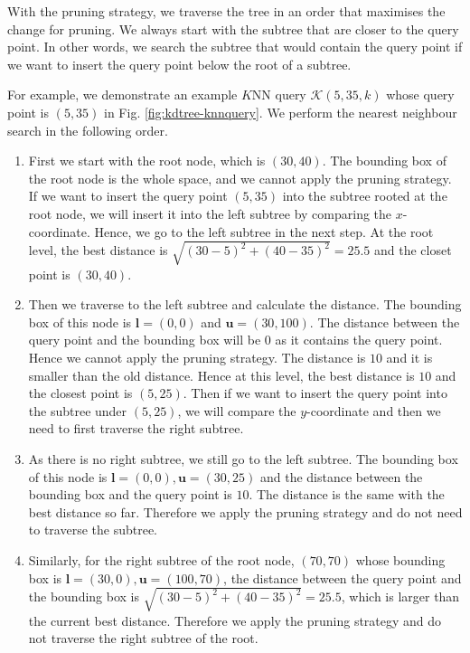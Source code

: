 With the pruning strategy, we traverse the tree in an order that maximises the change for pruning. We always start with the subtree that are closer to the query point. In other words, we search the subtree that would contain the query point if we want to insert the query point below the root of a subtree.

\begin{mscexample}
	For example, we demonstrate an example $K$NN query $\mathcal{K}(5, 35, k)$ whose query point is $(5, 35)$ in Fig. \ref{fig:kdtree-knnquery}. We perform the nearest neighbour search in the following order.
	
	\begin{enumerate}
		\item First we start with the root node, which is $(30,40)$. The bounding box of the root node is the whole space, and we cannot apply the pruning strategy. If we want to insert the query point $(5, 35)$ into the subtree rooted at the root node, we will insert it into the left subtree by comparing the $x$-coordinate. Hence, we go to the left subtree in the next step. At the root level, the best distance is $\sqrt{(30-5)^2+(40-35)^2}=25.5$ and the closet point is $(30,40)$.
		\item Then we traverse to the left subtree and calculate the distance. The bounding box of this node is $\boldsymbol{l}=(0,0)$ and $\boldsymbol{u}=(30,100)$. The distance between the query point and the bounding box will be $0$ as it contains the query point. Hence we cannot apply the pruning strategy. The distance is $10$ and it is smaller than the old distance. Hence at this level, the best distance is $10$ and the closest point is $(5,25)$. Then if we want to insert the query point into the subtree under $(5,25)$, we will compare the $y$-coordinate and then we need to first traverse the right subtree.
		\item As there is no right subtree, we still go to the left subtree. The bounding box of this node is $\boldsymbol{l}=(0,0), \boldsymbol{u}=(30,25)$ and the distance between the bounding box and the query point is $10$. The distance is the same with the best distance so far. Therefore we apply the pruning strategy and do not need to traverse the subtree.
		\item Similarly, for the right subtree of the root node, $(70,70)$ whose bounding box is $\boldsymbol{l}=(30,0), \boldsymbol{u}=(100,70)$, the distance between the query point and the bounding box is $\sqrt{(30-5)^2+(40-35)^2}=25.5$, which is larger than the current best distance. Therefore we apply the pruning strategy and do not traverse the right subtree of the root.
	\end{enumerate}
\end{mscexample}

